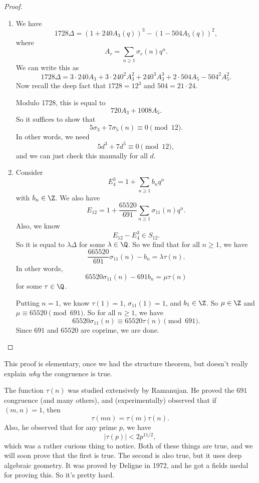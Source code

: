 \documentclass[a4paper]{article}
\begin{document}
\begin{proof}\leavevmode
  \begin{enumerate}
    \item We have
      \[
        1728 \Delta = (1 + 240 A_3(q))^3 - (1 - 504 A_5 (q))^2,
      \]
      where
      \[
        A_r = \sum_{n \geq 1} \sigma_r(n) q^n.
      \]
      We can write this as
      \[
         1728\Delta = 3\cdot 240 A_3 + 3\cdot 240^2 A_3^2 + 240^3 A_3^3 + 2\cdot 504 A_5 - 504^2 A_5^2.
      \]
      Now recall the deep fact that $1728 = 12^3$ and $504 = 21 \cdot 24$.

      Modulo 1728, this is equal to
      \[
        720 A_3 + 1008 A_5.
      \]
      So it suffices to show that
      \[
        5 \sigma_3 + 7 \sigma_5(n) \equiv 0 \pmod {12}.
      \]
      In other words, we need
      \[
        5 d^3 + 7 d^5 \equiv 0 \pmod {12},
      \]
      and we can just check this manually for all $d$.
    \item Consider
      \[
        E_4^3 = 1 + \sum_{n \geq 1} b_n q^n
      \]
      with $b_n \in \Z$. We also have
      \[
        E_{12} = 1 + \frac{65520}{691} \sum_{n \geq 1} \sigma_{11}(n) q^n.
      \]
      Also, we know
      \[
        E_{12} - E_4^3 \in S_{12}.
      \]
      So it is equal to $\lambda \Delta$ for some $\lambda \in \Q$. So we find that for all $n \geq 1$, we have
      \[
        \frac{665520}{691} \sigma_{11}(n) - b_n = \lambda \tau(n).
      \]
      In other words,
      \[
        65520 \sigma_{11}(n) - 691 b_n = \mu \tau(n)
      \]
      for some $\tau \in \Q$.

      Putting $n = 1$, we know $\tau(1) = 1$, $\sigma_{11}(1) = 1$, and $b_1 \in \Z$. So $\mu \in \Z$ and $\mu \equiv 65520 \pmod {691}$. So for all $n \geq 1$, we have
      \[
        65520 \sigma_{11}(n) \equiv 65520 \tau(n) \pmod {691}.
      \]
      Since $691$ and $65520$ are coprime, we are done.
  \end{enumerate}
\end{proof}
This proof is elementary, once we had the structure theorem, but doesn't really explain \emph{why} the congruence is true.

The function $\tau(n)$ was studied extensively by Ramanujan. He proved the $691$ congruence (and many others), and (experimentally) observed that if $(m, n) = 1$, then
\[
  \tau(mn) = \tau(m) \tau(n).
\]
Also, he observed that for any prime $p$, we have
\[
  |\tau(p)| < 2 p^{11/2},
\]
which was a rather curious thing to notice. Both of these things are true, and we will soon prove that the first is true. The second is also true, but it uses deep algebraic geometry. It was proved by Deligne in 1972, and he got a fields medal for proving this. So it's pretty hard.
\end{document}
